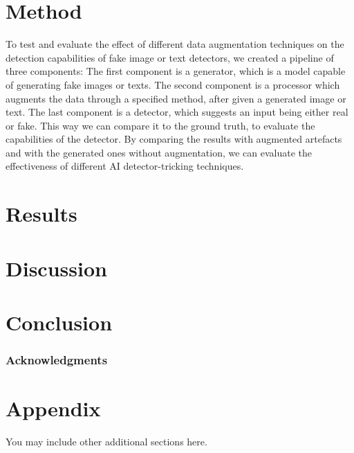\documentclass{article} %
\begin{document}
\section{Method}
To test and evaluate the effect of different data augmentation techniques on the detection capabilities of fake image or text detectors, we created a pipeline of three components: The first component is a generator, which is a model capable of generating fake images or texts. The second component is a processor which augments the data through a specified method, after given a generated image or text. The last component is a detector, which suggests an input being either real or fake. This way we can compare it to the ground truth, to evaluate the capabilities of the detector. By comparing the results with augmented artefacts and with the generated ones without augmentation, we can evaluate the effectiveness of different AI detector-tricking techniques.

\section{Results}

\section{Discussion}

\section{Conclusion}


\subsubsection*{Acknowledgments}





\appendix
\section{Appendix}
You may include other additional sections here.
\end{document}
